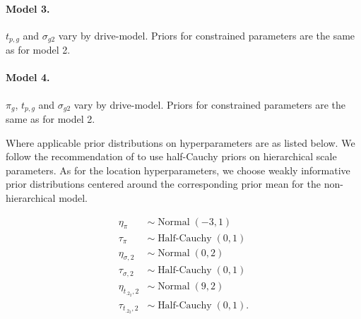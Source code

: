 \documentclass[12pt]{article}
\newcommand{\op}{\operatorname}
\begin{document}
\paragraph{Model 3.} $t_{p,g}$ and $\sigma_{g2}$ vary by drive-model. Priors for constrained parameters are the same as for model 2.

\paragraph{Model 4.} $\pi_g$, $t_{p,g}$ and $\sigma_{g2}$ vary by drive-model. Priors for constrained parameters are the same as for model 2.


Where applicable prior distributions on hyperparameters are as listed below. We follow the recommendation of \citet{gelman2014bayesian} to use half-Cauchy priors on hierarchical scale parameters. As for the location hyperparameters, we choose weakly informative prior distributions centered around the corresponding prior mean for the non-hierarchical model.

\begin{align*}
  \eta_{\pi} & \sim \op{Normal}(-3, 1)\\
  \tau_{\pi} & \sim \op{Half-Cauchy}(0, 1)\\
  \eta_{\sigma ,2} & \sim \op{Normal}(0, 2)\\
  \tau_{\sigma ,2} & \sim \op{Half-Cauchy}(0, 1)\\
  \eta_{t_{.2_2},2} & \sim \op{Normal}(9, 2)\\
  \tau_{t_{.2_2},2} & \sim \op{Half-Cauchy}(0, 1).
 \end{align*} 
\end{document}
